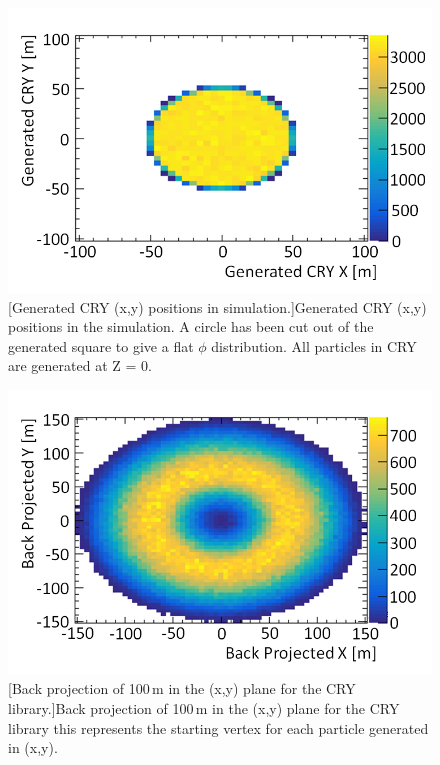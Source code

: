\begin{figure}[!h]
\centering
\begin{minipage}{.45\textwidth}
  \centering
  \includegraphics[width=\linewidth]{Chapter4/Figs/Raster/CryPlots/cryxm_vs_cryymMedText.png}
  [Generated CRY (x,y) positions in simulation.]{Generated CRY (x,y) positions in the simulation. A circle has been cut out of the generated square to give a flat $\phi$ distribution. All particles in CRY are generated at Z = 0.} 
  \label{fig:cryxm_vs_cryym}
\end{minipage}%
\qquad
\begin{minipage}{.45\textwidth}
  \centering
  \includegraphics[width=\linewidth]{Chapter4/Figs/Raster/CryPlots/BackProjectionXYMedText.png} 
  [Back projection of 100\,m in the (x,y) plane for the CRY library.]{Back projection of 100\,m in the (x,y) plane for the CRY library this represents the starting vertex for each particle generated in (x,y).}
  \label{fig:BackProjectionXY}
\end{minipage}
\end{figure}

